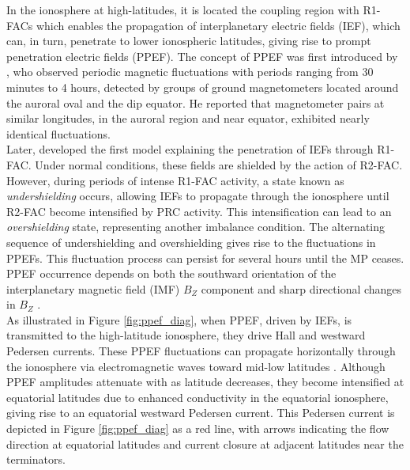 \documentclass[a4paper]{article}
\theoremstyle{plain}
\theoremstyle{definition}
\begin{document}
	
	In the ionosphere at high-latitudes, it is located the coupling region with R1-FACs which enables the propagation of interplanetary electric fields (IEF), which can, in turn, penetrate to lower ionospheric latitudes, giving rise to prompt penetration electric fields (PPEF). The concept of PPEF was first introduced by \cite{nishida_68_fluctuations, nishida_68_coherence}, who observed periodic magnetic fluctuations with periods ranging from 30 minutes to 4 hours, detected by groups of ground magnetometers located around the auroral oval and the dip equator. He reported that magnetometer pairs at similar longitudes, in the auroral region and near equator, exhibited nearly identical fluctuations.\\
	

	Later, \cite{PPEF_prediction, Jaggi1973SelfconsistentCO} developed the first model explaining the penetration of IEFs through R1-FAC. Under normal conditions, these fields are shielded by the action of R2-FAC. However, during periods of intense R1-FAC activity, a state known as \textit{undershielding} occurs, allowing IEFs to propagate through the ionosphere until R2-FAC become intensified by PRC activity. This intensification can lead to an \textit{overshielding} state, representing another imbalance condition. The alternating sequence of undershielding and overshielding gives rise to the fluctuations in PPEFs. This fluctuation process can persist for several hours \citep{PPEF_review} until the MP ceases. PPEF occurrence depends on both the southward orientation of the interplanetary magnetic field (IMF) $B_Z$ component and sharp directional changes in $B_Z$ \citep{Kelley1979, PPEF_review}.\\

	As illustrated in Figure \ref{fig:ppef_diag}, when PPEF, driven by IEFs, is transmitted to the high-latitude ionosphere, they drive Hall and westward Pedersen currents. These PPEF fluctuations can propagate horizontally through the ionosphere via electromagnetic waves toward mid-low latitudes \citep{PPEFtransmission1979, PPEF_review}. Although PPEF amplitudes attenuate with as latitude decreases, they become intensified at equatorial latitudes due to enhanced conductivity in the equatorial ionosphere, giving rise to an equatorial westward Pedersen current. This Pedersen current is depicted in Figure \ref{fig:ppef_diag} as a red line, with arrows indicating the flow direction at equatorial latitudes and current closure at adjacent latitudes near the terminators.\\
 
\end{document}
